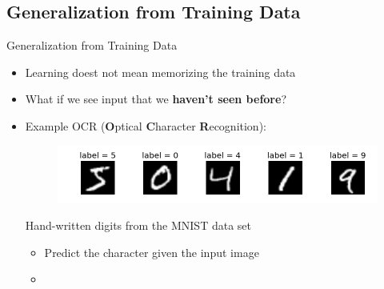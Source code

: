 \subsection{Generalization from Training Data}

\begin{frame}{Generalization from Training Data}{}\important
	\begin{itemize}
		\item Learning doest not mean memorizing the training data
		\item What if we see input that we \textbf{haven't seen before}?
		\item Example OCR (\textbf{O}ptical \textbf{C}haracter \textbf{R}ecognition):
		\begin{figure}
			\centering
			\includegraphics[scale=0.4]{01_intro_ml/02_img/mnist_digits}
		\end{figure}
		\vspace*{-4mm}
		\hfill{\scriptsize Hand-written digits from the MNIST data set}
		\begin{itemize}
			\item Predict the character given the input image
			\item {}
		\end{itemize}
	\end{itemize}
\end{frame}



